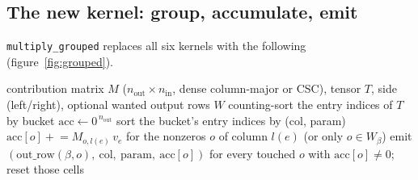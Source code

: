 \documentclass[11pt,a4paper]{article}
\newcommand{\nnz}{\operatorname{nnz}}
\newcommand{\code}[1]{\texttt{#1}}
\begin{document}
\subsection{The new kernel: group, accumulate, emit}

\code{multiply\_grouped} replaces all six kernels with the following (figure~\ref{fig:grouped}).

\begin{algorithmic}[1]
\Require contribution matrix $M$ ($n_{\text{out}} \times n_{\text{in}}$, dense column-major or CSC), tensor $T$, side (left/right), optional wanted output rows $W$
\State counting-sort the entry indices of $T$ by bucket \Comment{$O(\nnz(T) + \#\text{buckets})$}
\State $\text{acc} \gets 0^{\,n_{\text{out}}}$ 
  \State sort the bucket's entry indices by (col, param) 
      \State $\text{acc}[o] \mathrel{+}= M_{o,l(e)}\, v_e$ for the nonzeros $o$ of column $l(e)$ (or only $o \in W_\beta$)
    \EndFor
    \State emit $(\text{out\_row}(\beta,o),\ \text{col},\ \text{param},\ \text{acc}[o])$ for every touched $o$ with $\text{acc}[o] \ne 0$; reset those cells
  \EndFor
\EndFor
\end{algorithmic}
\end{document}
